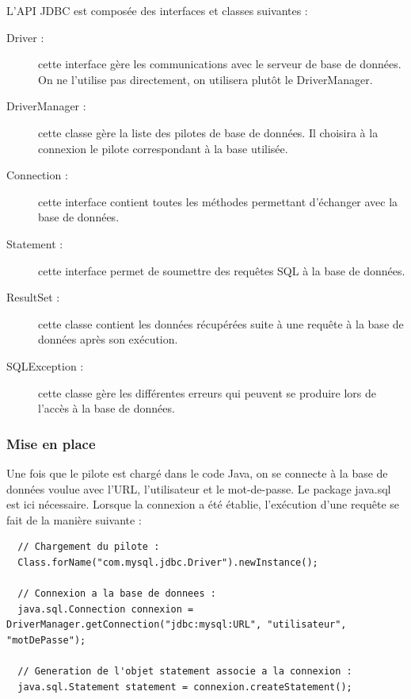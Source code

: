 L'API JDBC est composée des interfaces et classes suivantes :
\begin{description}
 \item[Driver :] cette interface gère les communications avec le serveur de base de données. On ne l'utilise pas directement, on utilisera plutôt le DriverManager.
 \item[DriverManager :] cette classe gère la liste des pilotes de base de données. Il choisira à la connexion le pilote correspondant à la base utilisée.
 \item[Connection :] cette interface contient toutes les méthodes permettant d'échanger avec la base de données.
 \item[Statement :] cette interface permet de soumettre des requêtes SQL à la base de données.
 \item[ResultSet :] cette classe contient les données récupérées suite à une requête à la base de données après son exécution.
 \item[SQLException :] cette classe gère les différentes erreurs qui peuvent se produire lors de l'accès à la base de données. 
\end{description}

\subsubsection{Mise en place}

Une fois que le pilote est chargé dans le code Java, on se connecte à la base de données voulue avec l'URL, l'utilisateur et le mot-de-passe. Le package java.sql est ici nécessaire. Lorsque la connexion a été établie, l'exécution d'une requête se fait de la manière suivante :
\begin{lstlisting}
  // Chargement du pilote :
  Class.forName("com.mysql.jdbc.Driver").newInstance();
  
  // Connexion a la base de donnees :
  java.sql.Connection connexion =  DriverManager.getConnection("jdbc:mysql:URL", "utilisateur", "motDePasse");
  
  // Generation de l'objet statement associe a la connexion :
  java.sql.Statement statement = connexion.createStatement();
\end{lstlisting}  
  
